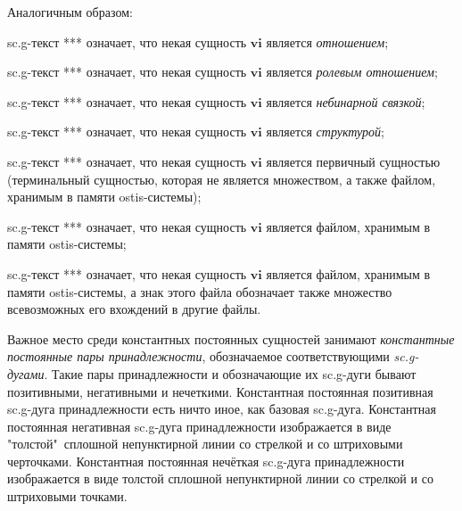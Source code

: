 \begin{SCn}
{Аналогичным образом: 
\begin{scnitemize}
\item sc.g-текст *** означает, что некая сущность $\bm{vi}$ является \textit{отношением}; 
\item sc.g-текст *** означает, что некая сущность $\bm{vi}$ является \textit{ролевым отношением}; 
\item sc.g-текст *** означает, что некая сущность $\bm{vi}$ является \textit{небинарной связкой}; 
\item sc.g-текст *** означает, что некая сущность $\bm{vi}$ является \textit{структурой}; 
\item sc.g-текст *** означает, что некая сущность $\bm{vi}$ является первичный сущностью (терминальный сущностью, которая не является множеством, а также файлом, хранимым в памяти ostis-системы); 
\item sc.g-текст *** означает, что некая сущность $\bm{vi}$ является файлом, хранимым в памяти ostis-системы;
\item sc.g-текст *** означает, что некая сущность $\bm{vi}$ является файлом, хранимым в памяти ostis-системы, а знак этого файла обозначает также множество всевозможных его вхождений в другие файлы. 
\end{scnitemize}

Важное место среди константных постоянных сущностей занимают \textit{константные постоянные пары принадлежности}, обозначаемое соответствующими \textit{sc.g-дугами}. Такие пары принадлежности и обозначающие их sc.g-дуги бывают позитивными, негативными и нечеткими. Константная постоянная позитивная sc.g-дуга принадлежности есть ничто иное, как базовая sc.g-дуга. Константная постоянная негативная sc.g-дуга принадлежности изображается в виде "толстой"\ сплошной непунктирной линии со стрелкой и со штриховыми черточками. Константная постоянная нечёткая sc.g-дуга принадлежности изображается в виде толстой сплошной непунктирной линии со стрелкой и со штриховыми точками.}

\scnendstruct


\end{SCn}
